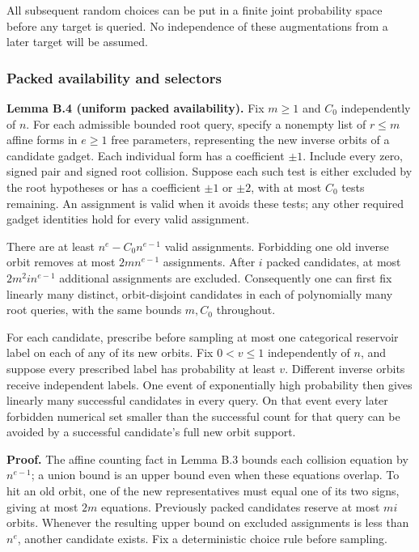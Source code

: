 \documentclass[11pt,a4paper]{article}
\newcommand{\statementstart}{\par\addvspace{6pt plus 1pt minus 1pt}\noindent}
\newcommand{\labelledparagraphstart}{\par\addvspace{3pt plus 1pt minus 1pt}\noindent}
\begin{document}
All subsequent random choices can be put in a finite joint probability space before any target is queried. No independence of these augmentations from a later target will be assumed.

\hypertarget{packed-availability-and-selectors}{%
\subsubsection{Packed availability and selectors}\label{packed-availability-and-selectors}}

\statementstart\textbf{Lemma B.4 (uniform packed availability).} Fix \(m\geq1\) and \(C_0\) independently of \(n\). For each admissible bounded root query, specify a nonempty list of \(r\leq m\) affine forms in \(e\geq1\) free parameters, representing the new inverse orbits of a candidate gadget. Each individual form has a coefficient \(\pm1\). Include every zero, signed pair and signed root collision. Suppose each such test is either excluded by the root hypotheses or has a coefficient \(\pm1\) or \(\pm2\), with at most \(C_0\) tests remaining. An assignment is valid when it avoids these tests; any other required gadget identities hold for every valid assignment.

There are at least \(n^e-C_0n^{e-1}\) valid assignments. Forbidding one old inverse orbit removes at most \(2mn^{e-1}\) assignments. After \(i\) packed candidates, at most \(2m^2i n^{e-1}\) additional assignments are excluded. Consequently one can first fix linearly many distinct, orbit-disjoint candidates in each of polynomially many root queries, with the same bounds \(m,C_0\) throughout.

For each candidate, prescribe before sampling at most one categorical reservoir label on each of any of its new orbits. Fix \(0<v\leq1\) independently of \(n\), and suppose every prescribed label has probability at least \(v\). Different inverse orbits receive independent labels. One event of exponentially high probability then gives linearly many successful candidates in every query. On that event every later forbidden numerical set smaller than the successful count for that query can be avoided by a successful candidate's full new orbit support.

\labelledparagraphstart\textbf{Proof.} The affine counting fact in Lemma B.3 bounds each collision equation by \(n^{e-1}\); a union bound is an upper bound even when these equations overlap. To hit an old orbit, one of the new representatives must equal one of its two signs, giving at most \(2m\) equations. Previously packed candidates reserve at most \(mi\) orbits. Whenever the resulting upper bound on excluded assignments is less than \(n^e\), another candidate exists. Fix a deterministic choice rule before sampling.
\end{document}
